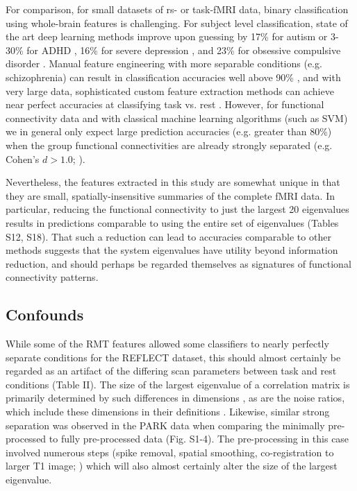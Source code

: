 \documentclass[NETN,manuscript]{stjour-new}
\begin{document}
For comparison, for small datasets of rs- or task-fMRI data, binary classification using whole-brain
features is challenging. For subject level classification, state of the art deep learning methods
improve upon guessing by 17\% for autism \citep{bengs4DSpatioTemporalDeep2020} or 3-30\% for ADHD
\citep{riazDeepFMRIEndtoendDeep2020}, 16\% for severe depression
\citep{ramasubbuAccuracyAutomatedClassification2016}, and 23\% for obsessive compulsive disorder
\citep{takagiNeuralMarkerObsessiveCompulsive2017}. Manual feature engineering with more separable
conditions (e.g. schizophrenia) can result in classification accuracies well above 90\%
\citep{duHighClassificationAccuracy2012}, and with very large data, sophisticated custom feature
extraction methods can achieve near perfect accuracies at classifying task vs. rest
\citep{zhangCharacterizingDifferentiatingTaskbased2016}. However, for functional connectivity data
and with classical machine learning algorithms (such as SVM) we in general only expect large
prediction accuracies (e.g. greater than 80\%) when the group functional connectivities are already
strongly separated (e.g. Cohen’s \(d > 1.0\); \citealp{dansereauStatisticalPowerPrediction2017}).

Nevertheless, the features extracted in this study are somewhat unique in that they are small,
spatially-insensitive summaries of the complete fMRI data. In particular, reducing the functional
connectivity to just the largest 20 eigenvalues results in predictions comparable to using the
entire set of eigenvalues (Tables S12, S18). That such a reduction can lead to accuracies comparable
to other methods suggests that the system eigenvalues have utility beyond information reduction, and
should perhaps be regarded themselves as signatures of functional connectivity patterns.

\subsection{Confounds}
While some of the RMT features allowed some classifiers to nearly perfectly separate conditions for
the REFLECT dataset, this should almost certainly be regarded as an artifact of the differing scan
parameters between task and rest conditions (Table II). The size of the largest eigenvalue of a
correlation matrix is primarily determined by such differences in dimensions
\citep{yinLimitLargestEigenvalue1988}, as are the noise ratios, which include these dimensions in
their definitions \citep{veraartDiffusionMRINoise2016,veraartDenoisingDiffusionMRI2016}. Likewise,
similar strong separation was observed in the PARK data when comparing the minimally pre-processed
to fully pre-processed data (Fig. S1-4). The pre-processing in this case involved numerous steps
(spike removal, spatial smoothing, co-registration to larger T1 image;
\citealp{madhyasthaDynamicConnectivityRest2015}) which will also almost certainly alter the size of
the largest eigenvalue.
\end{document}
